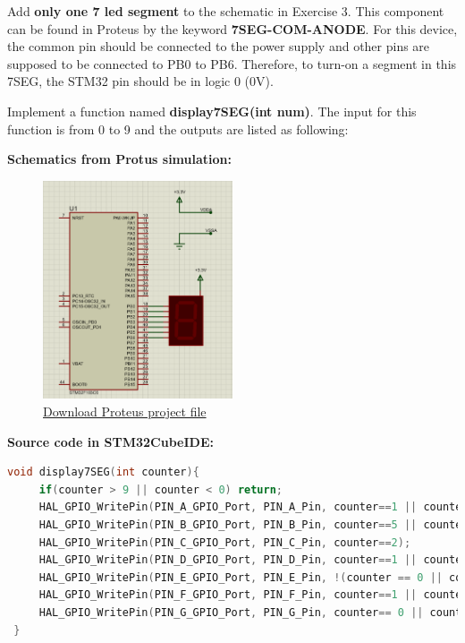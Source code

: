 \documentclass[twoside, final]{hcmut_report}
\begin{document}
Add \textbf{only one 7 led segment} to the schematic in Exercise 3. This component can be found in Proteus by the keyword \textbf{7SEG-COM-ANODE}. For this device, the common pin should be connected to the power supply and other pins are supposed to be connected to PB0 to PB6. Therefore, to turn-on a segment in this 7SEG, the STM32 pin should be in logic 0 (0V).

Implement a function named \textbf{display7SEG(int num)}. The input for this function is from 0 to 9 and the outputs are listed as following:


\textbf{Schematics from Protus simulation:}

\begin{figure}[ht]
    \centering
    \includegraphics[width=0.5\textwidth]{graphics/f5.png}
    \caption{
        \href{https://github.com/batmaon512/Microcontroller-251/blob/main/Lab/Lab1_LED_Animations/Source_Proteus/EX4.pdsprj}{Download Proteus project file}
    }
\end{figure}
\pagebreak
\textbf{Source code in STM32CubeIDE:}
\begin{lstlisting}[language=C, caption=Source code for Exercise 4]
 void display7SEG(int counter){
	 if(counter > 9 || counter < 0) return;
	 HAL_GPIO_WritePin(PIN_A_GPIO_Port, PIN_A_Pin, counter==1 || counter==4);
	 HAL_GPIO_WritePin(PIN_B_GPIO_Port, PIN_B_Pin, counter==5 || counter==6);
	 HAL_GPIO_WritePin(PIN_C_GPIO_Port, PIN_C_Pin, counter==2);
	 HAL_GPIO_WritePin(PIN_D_GPIO_Port, PIN_D_Pin, counter==1 || counter==4 || counter==7);
	 HAL_GPIO_WritePin(PIN_E_GPIO_Port, PIN_E_Pin, !(counter == 0 || counter == 2 || counter == 6 || counter == 8));
	 HAL_GPIO_WritePin(PIN_F_GPIO_Port, PIN_F_Pin, counter==1 || counter==2 || counter==3 || counter==7);
	 HAL_GPIO_WritePin(PIN_G_GPIO_Port, PIN_G_Pin, counter== 0 || counter==1 || counter==7);
 }
\end{lstlisting}
\end{document}
